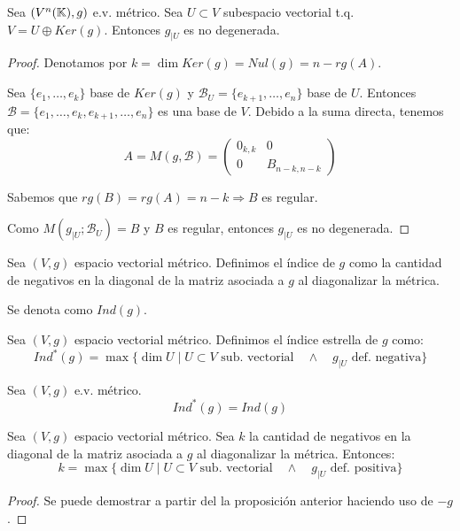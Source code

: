 \begin{prop}
    Sea $(V^n(\mathbb{K}), g)$ e.v. métrico. Sea $U\subset V$ subespacio vectorial t.q. $V=U\oplus Ker(g)$. Entonces $g_{\left|U \right.}$ es no degenerada.
\end{prop}
\begin{proof}
    Denotamos por $k=\dim Ker(g) = Nul(g) = n-rg(A)$.

    Sea $\{e_1, \dots, e_k\}$ base de $Ker(g)$ y $\mathcal{B}_U=\{e_{k+1}, \dots, e_n\}$ base de $U$. Entonces $\mathcal{B} = \{e_1, \dots, e_k, e_{k+1}, \dots, e_n\}$ es una base de $V$. Debido a la suma directa, tenemos que:
    \begin{equation*}
        A=M(g, \mathcal{B}) = \left(\begin{array}{c|c}
            0_{k,k} & 0 \\ \hline
            0 & B_{n-k, n-k}
        \end{array} \right)
    \end{equation*}

    Sabemos que $rg(B)=rg(A) = n-k \Longrightarrow B$ es regular.

    Como $M(g_{\left|U \right.}; \mathcal{B}_U) = B$ y $B$ es regular, entonces $g_{\left|U \right.}$ es no degenerada.
\end{proof}

\begin{definicion} [Índice] Sea $(V,g)$ espacio vectorial métrico. Definimos el índice de $g$ como la cantidad de negativos en la diagonal de la matriz asociada a $g$ al diagonalizar la métrica.

Se denota como $Ind(g)$.
\end{definicion}

\begin{definicion}  Sea $(V,g)$ espacio vectorial métrico. Definimos el índice estrella de $g$ como:
\begin{equation*}
    Ind^\ast (g) = \max \{\dim U \mid U\subset V \text{ sub. vectorial} \quad \land \quad g_{\left|U \right.} \text{ def. negativa}\}
\end{equation*}
\end{definicion}

\begin{prop} Sea $(V,g)$ e.v. métrico.
    $$Ind^\ast (g) = Ind(g)$$
\end{prop}

\begin{coro}
    Sea $(V,g)$ espacio vectorial métrico. Sea $k$ la cantidad de negativos en la diagonal de la matriz asociada a $g$ al diagonalizar la métrica.
    Entonces:
    \begin{equation*}
        k = \max \{\dim U \mid U\subset V \text{ sub. vectorial} \quad \land \quad g_{\left|U \right.} \text{ def. positiva}\}
    \end{equation*}
\end{coro}
\begin{proof}
    Se puede demostrar a partir del la proposición anterior haciendo uso de $-g$.
\end{proof}

